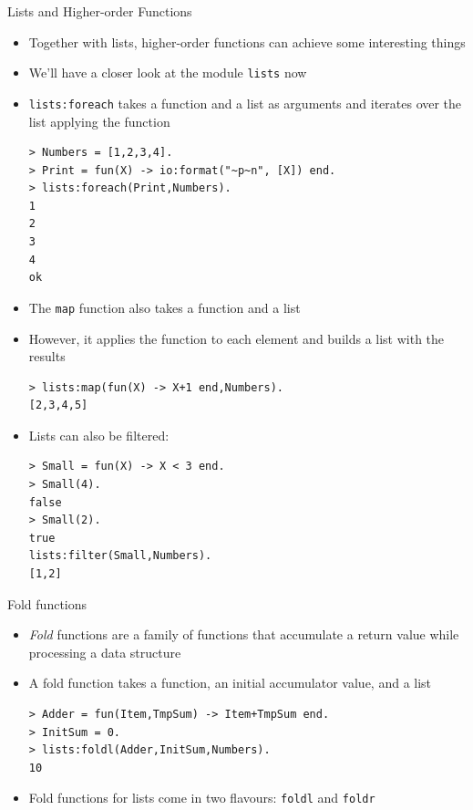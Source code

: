 \documentclass[12pt,xcolor=svgnames]{beamer}
\begin{document}
\begin{frame}{Lists and Higher-order Functions}
\begin{itemize}
\item Together with lists, higher-order functions can achieve some interesting things
\item We'll have a closer look at the module \texttt{lists} now
\item \texttt{lists:foreach} takes a function and a list as arguments and iterates over the list applying the function
\begin{Verbatim}
> Numbers = [1,2,3,4].
> Print = fun(X) -> io:format("~p~n", [X]) end.
> lists:foreach(Print,Numbers).
1
2
3
4
ok
\end{Verbatim}
\end{itemize}

\framebreak

\begin{itemize}
\item The \texttt{map} function also takes a function and a list
\item However, it applies the function to each element and builds a list with the results
\begin{Verbatim}
> lists:map(fun(X) -> X+1 end,Numbers).
[2,3,4,5]
\end{Verbatim}
\item Lists can also be filtered:
\begin{Verbatim}
> Small = fun(X) -> X < 3 end.
> Small(4).
false
> Small(2).
true
lists:filter(Small,Numbers).
[1,2]
\end{Verbatim}
\end{itemize}
\end{frame}

\begin{frame}[fragile]{Fold functions}
\begin{itemize}
\item \emph{Fold} functions are a family of functions that accumulate a return value while processing a data structure
\item A fold function takes a function, an initial accumulator value, and a list
\begin{Verbatim}
> Adder = fun(Item,TmpSum) -> Item+TmpSum end.
> InitSum = 0.
> lists:foldl(Adder,InitSum,Numbers).
10
\end{Verbatim}
\item Fold functions for lists come in two flavours: \texttt{foldl} and \texttt{foldr}
\end{itemize}
\end{frame}
\end{document}
